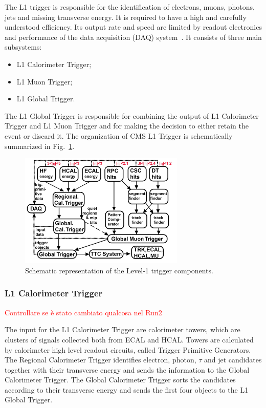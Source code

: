The L1 trigger is responsible for the identification of electrons, muons, photons, jets and missing transverse energy. It is required to have a high and carefully understood efficiency. Its output rate and speed are limited by readout electronics and performance of the data
acquisition (DAQ) system~\cite{Cittolin:578006}. It consists of three main subsystems:
\begin{itemize}
\item L1 Calorimeter Trigger;
\item L1 Muon Trigger;
\item L1 Global Trigger.
\end{itemize}
The L1 Global Trigger is responsible for combining the output of L1 Calorimeter
Trigger and L1 Muon Trigger and for making the decision to either retain the event or discard it. The organization of CMS L1 Trigger is schematically summarized in Fig.~\ref{fig:trigL1}.
\begin{figure}[htb]
\centering
\includegraphics[width=0.7\textwidth]{images/trigL1.png}
\caption{Schematic representation of the Level-1 trigger components.}\label{fig:trigL1}
\end{figure}

\subsubsection{L1 Calorimeter Trigger}
\textcolor{red}{Controllare se è stato cambiato qualcosa nel Run2}

The input for the L1 Calorimeter Trigger are calorimeter towers, which are clusters of signals collected both from ECAL and HCAL. Towers are calculated by calorimeter high level readout circuits, called Trigger Primitive Generators. The Regional Calorimeter Trigger identifies electron, photon, $\tau$ and jet candidates together with their transverse energy and sends the information to the Global Calorimeter Trigger. The Global Calorimeter Trigger sorts the candidates according to their transverse energy and sends the first four objects to the L1 Global Trigger.

